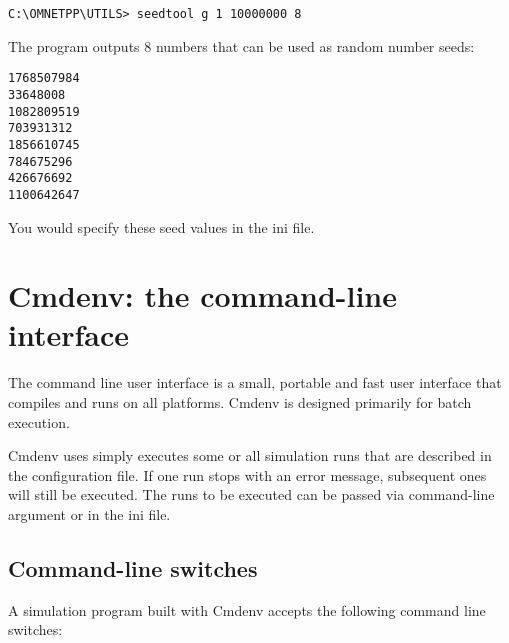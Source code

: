 \begin{verbatim}
C:\OMNETPP\UTILS> seedtool g 1 10000000 8
\end{verbatim}


The program outputs 8 numbers that can be used as random number
seeds:

\begin{verbatim}
1768507984
33648008
1082809519
703931312
1856610745
784675296
426676692
1100642647
\end{verbatim}


You would specify these seed values in the ini file.



\section{Cmdenv: the command-line interface}

The command line user interface is
a small, portable and fast user interface that compiles and runs on
all platforms. Cmdenv is designed primarily for batch execution.

Cmdenv uses simply executes some or all simulation runs that are described
in the configuration file. If one run stops with an error message,
subsequent ones will still be executed. The runs to be executed can be
passed via command-line argument or in the ini file.

\subsection{Command-line switches}

A simulation program built with Cmdenv accepts the following command line
switches:


